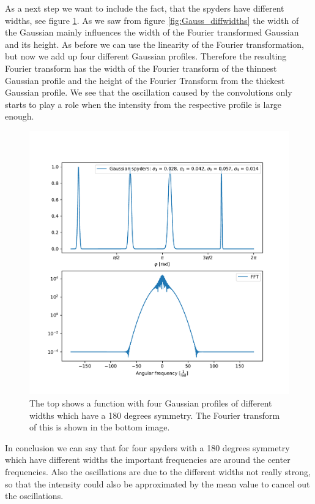As a next step we want to include the fact, that the spyders have different widths, see figure \ref{fig:Gaussian_fourdiffspyders}. As we saw from figure \ref{fig:Gauss_diffwidths} the width of the Gaussian mainly influences the width of the Fourier transformed Gaussian and its height. As before we can use the linearity of the Fourier transformation, but now we add up four different Gaussian profiles. Therefore the resulting Fourier transform has the width of the Fourier transform of the thinnest Gaussian profile and the height of the Fourier Transform from the thickest Gaussian profile. We see that the oscillation caused by the convolutions only starts to play a role when the intensity from the respective profile is large enough. 
\begin{figure}[H]
	\centering
		\includegraphics[width=1.0\textwidth]{pics/Gaussian_fourdiffspyders.pdf}
		\caption{The top shows a function with four Gaussian profiles of different widths which have a 180 degrees symmetry. The Fourier transform of this is shown in the bottom image.}
		\label{fig:Gaussian_fourdiffspyders}
\end{figure} 
In conclusion we can say that for four spyders with a 180 degrees symmetry which have different widths the important frequencies are around the center frequencies. Also the oscillations are due to the different widths not really strong, so that the intensity could also be approximated by the mean value to cancel out the oscillations.  

